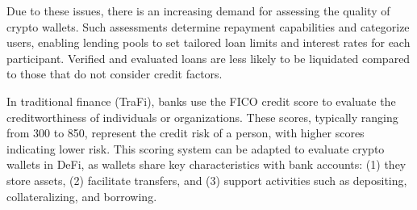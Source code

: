 \documentclass[runningheads]{llncs}
\begin{document}


Due to these issues, there is an increasing demand for assessing the quality of crypto wallets. Such assessments determine repayment capabilities and categorize users, enabling lending pools to set tailored loan limits and interest rates for each participant. Verified and evaluated loans are less likely to be liquidated compared to those that do not consider credit factors.


In traditional finance (TraFi), banks use the FICO credit score to evaluate the creditworthiness of individuals or organizations. These scores, typically ranging from 300 to 850, represent the credit risk of a person, with higher scores indicating lower risk. 
This scoring system can be adapted to evaluate crypto wallets in DeFi, as wallets share key characteristics with bank accounts: (1) they store assets, (2) facilitate transfers, and (3) support activities such as depositing, collateralizing, and borrowing.
\end{document}
